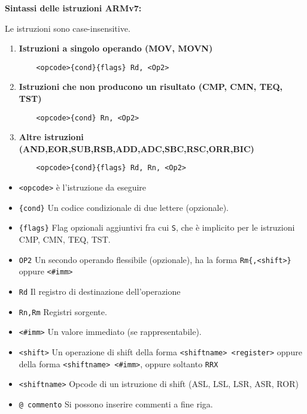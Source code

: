 \begin{defn}
\textbf{Sintassi delle istruzioni ARMv7:}

\begin{note}
	Le istruzioni sono case-insensitive.
\end{note}	

\begin{enumerate}
	\item \textbf{Istruzioni a singolo operando (MOV, MOVN)}
	\begin{Verbatim}
	<opcode>{cond}{flags} Rd, <Op2>
	\end{Verbatim}

	\item \textbf{Istruzioni che non producono un risultato (CMP, CMN, TEQ, TST)}
	\begin{Verbatim}
	<opcode>{cond} Rn, <Op2>
	\end{Verbatim}

	\item \textbf{Altre istruzioni (AND,EOR,SUB,RSB,ADD,ADC,SBC,RSC,ORR,BIC)}
	\begin{Verbatim}
	<opcode>{cond}{flags} Rd, Rn, <Op2>
	\end{Verbatim}
\end{enumerate}


\begin{itemize}
	\item \verb|<opcode>| è l'istruzione da eseguire
	\item \verb|{cond}| Un codice condizionale di due lettere (opzionale).
	\item \verb|{flags}| Flag opzionali aggiuntivi fra cui \verb|S|, che è implicito per le istruzioni CMP, CMN, TEQ, TST.
	\item \verb|OP2| Un secondo operando flessibile (opzionale), ha la forma \verb|Rm{,<shift>}| oppure \verb|<#imm>|
	\item \verb|Rd| Il registro di destinazione dell'operazione
	\item \verb|Rn,Rm| Registri sorgente.
	\item \verb|<#imm>| Un valore immediato (se rappresentabile).
	\item \verb|<shift>| Un operazione di shift della forma \verb|<shiftname> <register>| oppure della forma \verb|<shiftname> <#imm>|, oppure soltanto \verb|RRX|
	\item \verb|<shiftname>| Opcode di un istruzione di shift (ASL, LSL, LSR, ASR, ROR)
	\item \verb|@ commento| Si possono inserire commenti a fine riga.
\end{itemize}
\end{defn}

